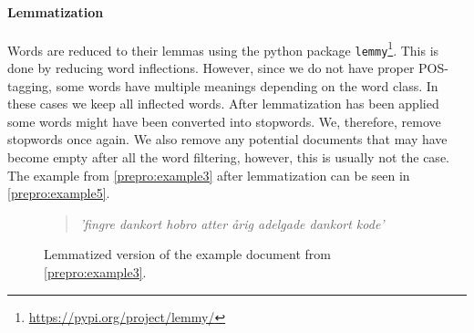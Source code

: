 \paragraph{Lemmatization}
Words are reduced to their lemmas using the python package \texttt{lemmy}\footnote{\url{https://pypi.org/project/lemmy/}}. 
This is done by reducing word inflections.
However, since we do not have proper POS-tagging, some words have multiple meanings depending on the word class.
In these cases we keep all inflected words.
After lemmatization has been applied some words might have been converted into stopwords.
We, therefore, remove stopwords once again.
We also remove any potential documents that may have become empty after all the word filtering, however, this is usually not the case.
The example from \autoref{prepro:example3} after lemmatization can be seen in \autoref{prepro:example5}.
\begin{figure}[h]
	\begin{framed}
		\begin{quote}
			\textit{
				'fingre dankort hobro atter årig adelgade dankort kode'
			}
		\end{quote}
	\end{framed}
	\caption{Lemmatized version of the example document from \autoref{prepro:example3}.}
	\label{prepro:example5}
\end{figure}


